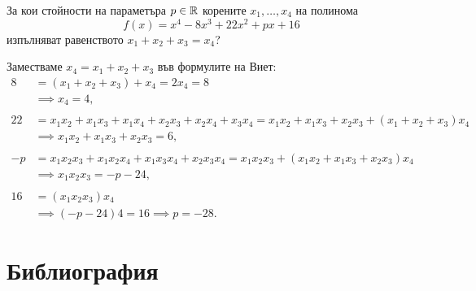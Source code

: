 \documentclass[numbers=endperiod, DIV=15]{scrartcl}
\begin{document}
\begin{exercise}
  За кои стойности на параметъра $p \in \mathbb{R}$ корените $x_1, \ldots, x_4$ на полинома
  \begin{displaymath}
    f(x) = x^4 - 8x^3 + 22x^2 + px + 16
  \end{displaymath}
  изпълняват равенството $x_1 + x_2 + x_3 = x_4$?
\end{exercise}
\begin{solution}
  Заместваме $x_4 = x_1 + x_2 + x_3$ във формулите на Виет:
  \begin{align*}
    8 &= (x_1 + x_2 + x_3) + x_4 = 2x_4 = 8
    \\&\implies
    x_4 = 4,
    \\ \\
    22 &= x_1 x_2 + x_1 x_3 + x_1 x_4 + x_2 x_3 + x_2 x_4 + x_3 x_4 = x_1 x_2 + x_1 x_3 + x_2 x_3 + (x_1 + x_2 + x_3) x_4
    \\&\implies
    x_1 x_2 + x_1 x_3 + x_2 x_3 = 6,
    \\ \\
    -p &= x_1 x_2 x_3 + x_1 x_2 x_4 + x_1 x_3 x_4 + x_2 x_3 x_4 = x_1 x_2 x_3 + (x_1 x_2 + x_1 x_3 + x_2 x_3) x_4 \\&\implies
    x_1 x_2 x_3 = -p - 24,
    \\ \\
    16 &= (x_1 x_2 x_3) x_4
    \\&\implies
    (-p - 24) 4 = 16 \implies p = -28.
  \end{align*}
\end{solution}

\section{Библиография}
\printbibliography
\end{document}
